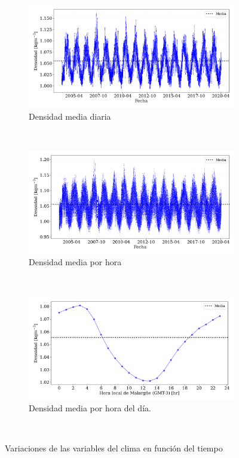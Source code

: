 \begin{figure}[H]
	\centering
        \begin{subfigure}[b]{0.9\textwidth}	
			\includegraphics[width=\textwidth]{Graphs/clima/densidad_diaria_v2.png}
			\caption{Densidad media diaria}
			\label{fig:densidad_diaria}
        \end{subfigure}\\
        \begin{subfigure}[b]{0.9\textwidth}
			\includegraphics[width=\textwidth]{Graphs/clima/densidad_media_diaria_v2.png}
			\caption{Densidad media por hora}
			\label{fig:densidad_hora}
		\end{subfigure}\\
        \begin{subfigure}[b]{0.9\textwidth}	
			\includegraphics[width=\textwidth]{Graphs/clima/densidad_hod_v2.png}
			\caption{Densidad media por hora del día.}
			\label{fig:area_auger}
        \end{subfigure}\\
  \caption{Variaciones de las variables del clima en función del tiempo}
  \label{fig:clima_p_rho}
\end{figure}

